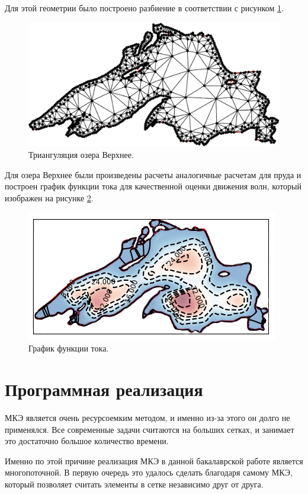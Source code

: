 \documentclass[14pt]{extreport}
\begin{document}
Для этой геометрии было построено разбиение в соответствии с рисунком \ref{img:ex4:mesh}.

\begin{figure}[H]
\centerline{
\includegraphics[width=0.8\linewidth]{images/ex4/mesh}}
\caption{Триангуляция озера Верхнее.}
\label{img:ex4:mesh}
\end{figure}

Для озера Верхнее были произведены расчеты аналогичные расчетам для пруда и построен график функции тока для качественной оценки движения волн, который изображен на рисунке \ref{img:ex4:psi}.

\begin{figure}[H]
\centerline{
\includegraphics[width=0.8\linewidth]{images/ex4/psi/1}}
\caption{График функции тока.}
\label{img:ex4:psi}
\end{figure}


\section{Программная реализация}

МКЭ является очень ресурсоемким методом, и именно из-за этого он долго не применялся. Все современные задачи считаются на больших сетках, и занимает это достаточно большое количество времени.

Именно по этой причине реализация МКЭ в данной бакалаврской работе является многопоточной. В первую очередь это удалось сделать благодаря самому МКЭ, который позволяет считать элементы в сетке независимо друг от друга. 
\end{document}
